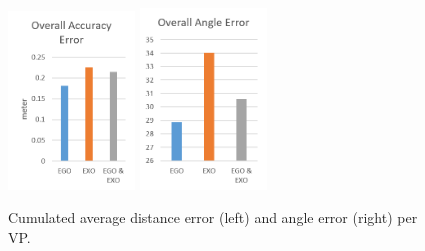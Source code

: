 \begin{figure}[htb]
	\centering
	\includegraphics[width=0.3\textwidth]{figures/cumulatedDistanceError.png}
	\includegraphics[width=0.3\textwidth]{figures/cumulatedAngleError.png}
	\caption[Cumulated error per perspective.]{Cumulated average distance error (left) and angle error (right) per VP.}
	\label{fig:cumulatedError}
\end{figure}


